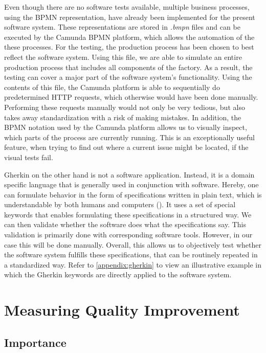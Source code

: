 Even though there are no software tests available, multiple business processes, using the BPMN representation, have already been implemented for the present software system. These representations are stored in \emph{.bmpn} files and can be executed by the Camunda BPMN platform, which allows the automation of the these processes. For the testing, the production process has been chosen to best reflect the software system. Using this file, we are able to simulate an entire production process that includes all components of the factory. As a result, the testing can cover a major part of the software system's functionality. Using the contents of this file, the Camunda platform is able to sequentially do predetermined HTTP requests, which otherwise would have been done manually. Performing these requests manually would not only be very tedious, but also takes away standardization with a risk of making mistakes. In addition, the BPMN notation used by the Camunda platform allows us to visually inspect, which parts of the process are currently running. This is an exceptionally useful feature, when trying to find out where a current issue might be located, if the visual tests fail.


Gherkin on the other hand is not a software application. Instead, it is a domain specific language that is generally used in conjunction with software. Hereby, one can formulate behavior in the form of specifications written in plain text, which is understandable by both humans and computers (\cite{zotero-undefineda}). It uses a set of special keywords that enables formulating these specifications in a structured way. We can then validate whether the software does what the specifications say. This validation is primarily done with corresponding software tools. However, in our case this will be done manually. Overall, this allows us to objectively test whether the software system fulfills these specifications, that can be routinely repeated in a standardized way. Refer to \ref{appendix:gherkin} to view an illustrative example in which the Gherkin keywords are directly applied to the software system.

\section{Measuring Quality Improvement}
\subsection{Importance}

